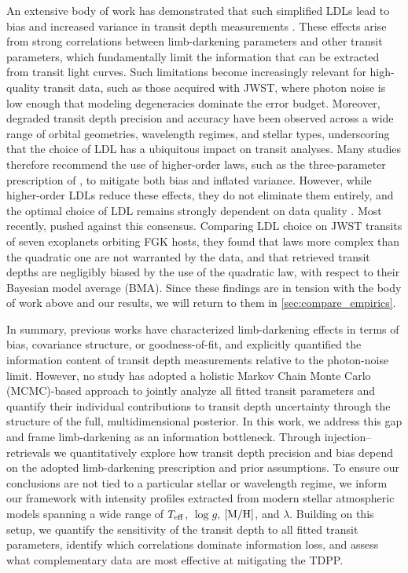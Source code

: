 \documentclass[twocolumn]{aastex631}
\newcommand{\vtwo}[1]{{#1}}
\begin{document}
An extensive body of work has demonstrated that such simplified LDLs lead to bias and increased variance in transit depth measurements \citep[e.g.,][]{Southworth2008, Carter2008, Csizmadia2013, Neilson2013a, Neilson2013b, Espinoza2015, Espinoza2016, Morello2017, Keers2024}. These effects arise from strong correlations between limb-darkening parameters and other transit parameters, which fundamentally limit the information that can be extracted from transit light curves. Such limitations become increasingly relevant for high-quality transit data, such as those acquired with JWST, where photon noise is low enough that modeling degeneracies dominate the error budget. Moreover, degraded transit depth precision and accuracy have been observed across a wide range of orbital geometries, wavelength regimes, and stellar types, underscoring that the choice of LDL has a ubiquitous impact on transit analyses. Many studies therefore recommend the use of higher-order laws, such as the three-parameter prescription of \cite{Sing2010}, to mitigate both bias and inflated variance. However, while higher-order LDLs reduce these effects, they do not eliminate them entirely, and the optimal choice of LDL remains strongly dependent on data quality \citep[see Figure 7 of][hereafter ]{Espinoza2016}. \vtwo{Most recently, \citet[][hereafter ]{Sing2026} pushed against this consensus. Comparing LDL choice on JWST transits of seven exoplanets orbiting FGK hosts, they found that laws more complex than the quadratic one are not warranted by the data, and that retrieved transit depths are negligibly biased by the use of the quadratic law, with respect to their Bayesian model average (BMA). Since these findings are in tension with the body of work above and our results, we will return to them in \autoref{sec:compare_empirics}}.

In summary, previous works have characterized limb-darkening effects in terms of bias, covariance structure, or goodness-of-fit, and explicitly quantified the information content of transit depth measurements relative to the photon-noise limit. However, no study has adopted a holistic Markov Chain Monte Carlo (MCMC)-based approach to jointly analyze all fitted transit parameters and quantify their individual contributions to transit depth uncertainty through the structure of the full, multidimensional posterior. In this work, we address this gap and frame limb-darkening as an information bottleneck. Through injection--retrievals we quantitatively explore how transit depth precision and bias depend on the adopted limb-darkening prescription and prior assumptions. To ensure our conclusions are not tied to a particular stellar or wavelength regime, we \vtwo{inform} our framework with intensity profiles extracted from modern stellar atmospheric models spanning a wide range of $T_{\rm eff}$, $\log g$, $[{\rm M/H}]$, and $\lambda$. Building on this setup, we quantify the sensitivity of the transit depth to all fitted transit parameters, identify which correlations dominate information loss, and assess what complementary data are most effective at mitigating the TDPP.
\end{document}
